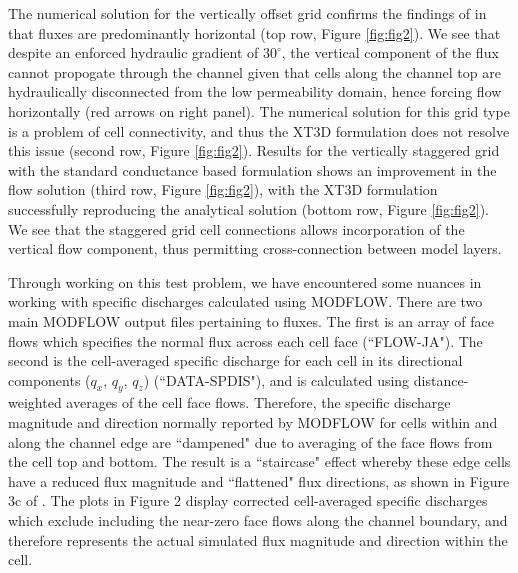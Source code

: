\documentclass{article}
\begin{document}
The numerical solution for the vertically offset grid confirms the findings of \cite{bardot2022} in that fluxes are predominantly horizontal (top row, Figure \ref{fig:fig2}). We see that despite an enforced hydraulic gradient of $30^{\circ}$, the vertical component of the flux cannot propogate through the channel given that cells along the channel top are hydraulically disconnected from the low permeability domain, hence forcing flow horizontally (red arrows on right panel). The numerical solution for this grid type is a problem of cell connectivity, and thus the XT3D formulation does not resolve this issue (second row, Figure \ref{fig:fig2}). Results for the vertically staggered grid with the standard conductance based formulation shows an improvement in the flow solution (third row, Figure \ref{fig:fig2}), with the XT3D formulation successfully reproducing the analytical solution (bottom row, Figure \ref{fig:fig2}). We see that the staggered grid cell connections allows incorporation of the vertical flow component, thus permitting cross-connection between model layers.

Through working on this test problem, we have encountered some nuances in working with specific discharges calculated using MODFLOW. There are two main MODFLOW output files pertaining to fluxes. The first is an array of face flows which specifies the normal flux across each cell face (``FLOW-JA"). The second is the cell-averaged specific discharge for each cell in its directional components ($q_{x}$, $q_{y}$, $q_{z}$) (``DATA-SPDIS"), and is calculated using distance-weighted averages of the cell face flows. Therefore, the specific discharge magnitude and direction normally reported by MODFLOW for cells within and along the channel edge are ``dampened" due to averaging of the face flows from the cell top and bottom. The result is a ``staircase" effect whereby these edge cells have a reduced flux magnitude and ``flattened" flux directions, as shown in Figure 3c of \cite{bardot2022}. The plots in Figure 2 display corrected cell-averaged specific discharges which exclude including the near-zero face flows along the channel boundary, and therefore represents the actual simulated flux magnitude and direction within the cell. 

\end{document}

